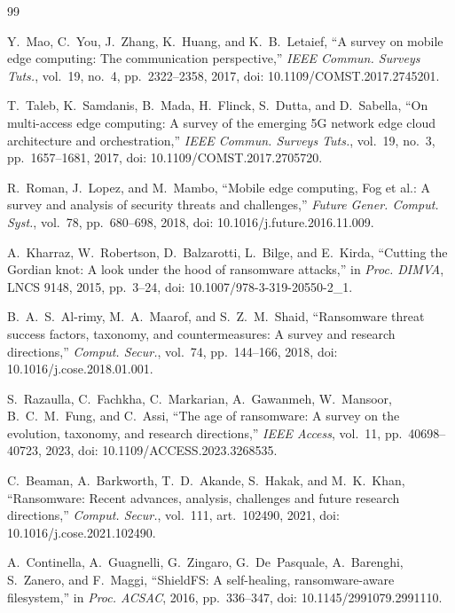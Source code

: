 \documentclass[journal]{IEEEtran}
\begin{document}
\begin{thebibliography}{99}
\footnotesize

 Y.~Mao, C.~You, J.~Zhang, K.~Huang, and K.~B.~Letaief,
``A survey on mobile edge computing: The communication perspective,''
\emph{IEEE Commun. Surveys Tuts.}, vol.~19, no.~4, pp.~2322--2358, 2017,
doi: 10.1109/COMST.2017.2745201.

 T.~Taleb, K.~Samdanis, B.~Mada, H.~Flinck, S.~Dutta, and
D.~Sabella, ``On multi-access edge computing: A survey of the emerging 5G
network edge cloud architecture and orchestration,'' \emph{IEEE Commun. Surveys
Tuts.}, vol.~19, no.~3, pp.~1657--1681, 2017,
doi: 10.1109/COMST.2017.2705720.

 R.~Roman, J.~Lopez, and M.~Mambo, ``Mobile edge
computing, Fog et al.: A survey and analysis of security threats and
challenges,'' \emph{Future Gener. Comput. Syst.}, vol.~78, pp.~680--698, 2018,
doi: 10.1016/j.future.2016.11.009.

 A.~Kharraz, W.~Robertson, D.~Balzarotti,
L.~Bilge, and E.~Kirda, ``Cutting the Gordian knot: A look under the hood of
ransomware attacks,'' in \emph{Proc. DIMVA}, LNCS 9148, 2015, pp.~3--24,
doi: 10.1007/978-3-319-20550-2\_1.

 B.~A.~S.~Al-rimy, M.~A.~Maarof, and
S.~Z.~M.~Shaid, ``Ransomware threat success factors, taxonomy, and
countermeasures: A survey and research directions,'' \emph{Comput. Secur.},
vol.~74, pp.~144--166, 2018, doi: 10.1016/j.cose.2018.01.001.

 S.~Razaulla, C.~Fachkha, C.~Markarian, A.~Gawanmeh,
W.~Mansoor, B.~C.~M.~Fung, and C.~Assi, ``The age of ransomware: A survey on the
evolution, taxonomy, and research directions,'' \emph{IEEE Access}, vol.~11,
pp.~40698--40723, 2023, doi: 10.1109/ACCESS.2023.3268535.

 C.~Beaman, A.~Barkworth, T.~D.~Akande, S.~Hakak,
and M.~K.~Khan, ``Ransomware: Recent advances, analysis, challenges and future
research directions,'' \emph{Comput. Secur.}, vol.~111, art.~102490, 2021,
doi: 10.1016/j.cose.2021.102490.

 A.~Continella, A.~Guagnelli, G.~Zingaro,
G.~De~Pasquale, A.~Barenghi, S.~Zanero, and F.~Maggi, ``ShieldFS: A
self-healing, ransomware-aware filesystem,'' in \emph{Proc. ACSAC}, 2016,
pp.~336--347, doi: 10.1145/2991079.2991110.


\end{thebibliography}
\end{document}

